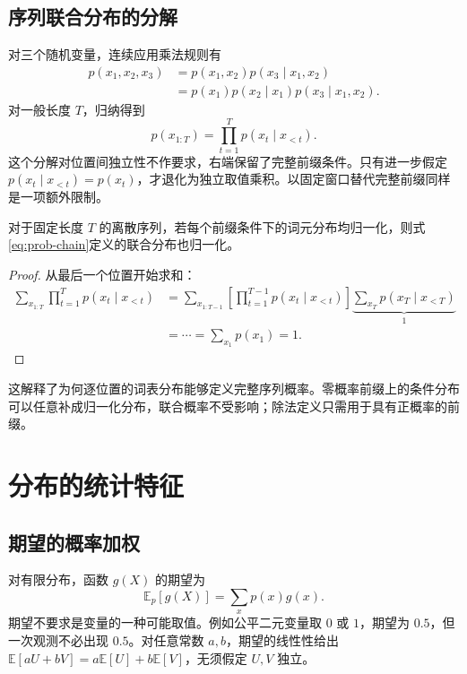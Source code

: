 \documentclass[../textbook.tex]{subfiles}
\begin{document}
\subsection{序列联合分布的分解}
对三个随机变量，连续应用乘法规则有
\begin{align}
 p(x_1,x_2,x_3)
 &=p(x_1,x_2)p(x_3\mid x_1,x_2)\\
 &=p(x_1)p(x_2\mid x_1)p(x_3\mid x_1,x_2).
\end{align}
对一般长度 $T$，归纳得到
\begin{equation}\label{eq:prob-chain}
 p(x_{1:T})=\prod_{t=1}^T p(x_t\mid x_{<t}).
\end{equation}
这个分解对位置间独立性不作要求，右端保留了完整前缀条件。只有进一步假定 $p(x_t\mid x_{<t})=p(x_t)$，才退化为独立取值乘积。以固定窗口替代完整前缀同样是一项额外限制。

\begin{proposition}[序列分布的归一化]
对于固定长度 $T$ 的离散序列，若每个前缀条件下的词元分布均归一化，则式\eqref{eq:prob-chain}定义的联合分布也归一化。
\end{proposition}
\begin{proof}
从最后一个位置开始求和：
\begin{align}
 \sum_{x_{1:T}}\prod_{t=1}^T p(x_t\mid x_{<t})
 &=\sum_{x_{1:T-1}}\left[\prod_{t=1}^{T-1}p(x_t\mid x_{<t})\right]
 \underbrace{\sum_{x_T}p(x_T\mid x_{<T})}_{1}\\
 &=\cdots=\sum_{x_1}p(x_1)=1.
\end{align}
\end{proof}
这解释了为何逐位置的词表分布能够定义完整序列概率。零概率前缀上的条件分布可以任意补成归一化分布，联合概率不受影响；除法定义只需用于具有正概率的前缀。

\section{分布的统计特征}

\subsection{期望的概率加权}
对有限分布，函数 $g(X)$ 的期望为
\begin{equation}
 \mathbb E_p[g(X)]=\sum_x p(x)g(x).
\end{equation}
期望不要求是变量的一种可能取值。例如公平二元变量取 $0$ 或 $1$，期望为 $0.5$，但一次观测不必出现 $0.5$。对任意常数 $a,b$，期望的线性性给出
$\mathbb E[aU+bV]=a\mathbb E[U]+b\mathbb E[V]$，无须假定 $U,V$ 独立。
\end{document}
